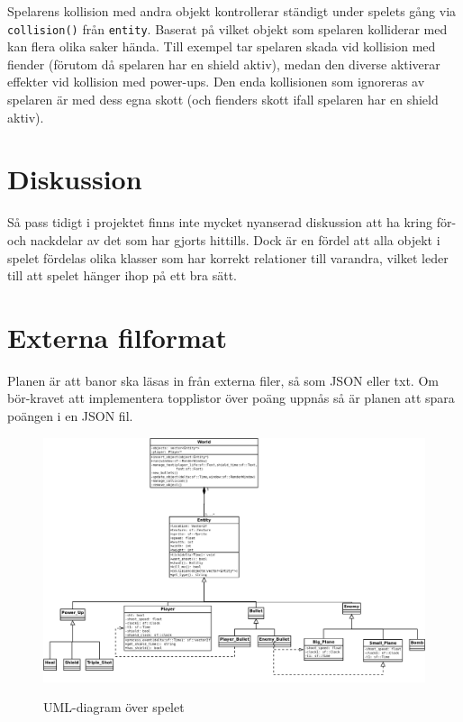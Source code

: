 \documentclass{TDP003mall}
\begin{document}
Spelarens kollision med andra objekt kontrollerar ständigt under spelets gång via \texttt{collision()} från \texttt{entity}. Baserat på vilket objekt som spelaren kolliderar med kan flera olika saker hända.
Till exempel tar spelaren skada vid kollision med fiender (förutom då spelaren har en shield aktiv), medan den diverse aktiverar effekter vid kollision med power-ups. 
Den enda kollisionen som ignoreras av spelaren är med dess egna skott (och fienders skott ifall spelaren har en shield aktiv).



\section{Diskussion}
Så pass tidigt i projektet finns inte mycket nyanserad diskussion att ha kring för- och nackdelar av det som har gjorts hittills. 
Dock är en fördel att alla objekt i spelet fördelas olika klasser som har korrekt relationer till varandra, vilket leder till att spelet hänger ihop på ett bra sätt.

\section{Externa filformat} 
Planen är att banor ska läsas in från externa filer, så som JSON eller txt. Om bör-kravet att implementera topplistor över poäng uppnås så är planen att spara poängen i en JSON fil.
\begin{figure}[h!]
\centering
\includegraphics[scale=0.35]{UML_diagram.png}
\label{}
\caption{UML-diagram över spelet}
\end{figure}
\end{document}
